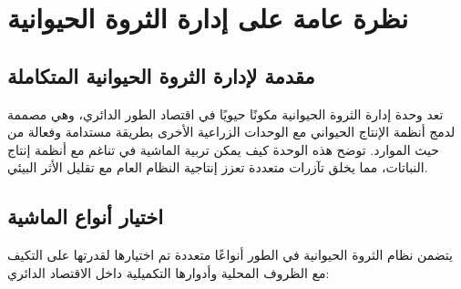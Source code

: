\section{نظرة عامة على إدارة الثروة الحيوانية}

\subsection{مقدمة لإدارة الثروة الحيوانية المتكاملة}

تعد وحدة إدارة الثروة الحيوانية مكونًا حيويًا في اقتصاد الطور الدائري، وهي مصممة لدمج أنظمة الإنتاج الحيواني مع الوحدات الزراعية الأخرى بطريقة مستدامة وفعالة من حيث الموارد. توضح هذه الوحدة كيف يمكن تربية الماشية في تناغم مع أنظمة إنتاج النباتات، مما يخلق تآزرات متعددة تعزز إنتاجية النظام العام مع تقليل الأثر البيئي.

\subsection{اختيار أنواع الماشية}

يتضمن نظام الثروة الحيوانية في الطور أنواعًا متعددة تم اختيارها لقدرتها على التكيف مع الظروف المحلية وأدوارها التكميلية داخل الاقتصاد الدائري:


